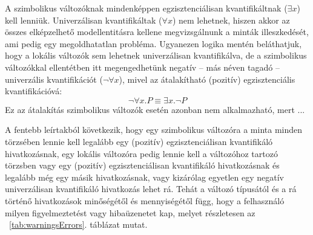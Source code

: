 A szimbolikus változóknak mindenképpen egzisztenciálisan kvantifikáltnak ($\exists x$) kell lenniük. Univerzálisan kvantifikáltak ($\forall x$) nem lehetnek, hiszen akkor az összes elképzelhető modellentitásra kellene megvizsgálnunk a minták illeszkedését, ami pedig egy megoldhatatlan probléma. Ugyanezen logika mentén beláthatjuk, hogy a lokális változók sem lehetnek univerzálisan kvantifikálva, de a szimbolikus változókkal ellentétben itt megengedhetünk negatív -- más néven tagadó -- univerzális kvantifikációt ($\neg\forall x$), mivel az átalakítható (pozitív) egzisztenciális kvantifikációvá: 
\begin{equation}
\neg\forall x. P \equiv \exists x. \neg P \label{eq:negforalltoexists}
\end{equation}
Ez az átalakítás szimbolikus változók esetén azonban nem alkalmazható, mert ...

A fentebb leírtakból következik, hogy egy szimbolikus változóra a minta minden törzsében lennie kell legalább egy (pozitív) egzisztenciálisan kvantifikáló hivatkozásnak, egy lokális változóra pedig lennie kell a változóhoz tartozó törzsben vagy egy (pozitív) egzisztenciálisan kvantifikáló hivatkozásnak és legalább még egy másik hivatkozásnak, vagy kizárólag egyetlen egy negatív univerzálisan kvantifikáló hivatkozás lehet rá.
Tehát a változó típusától és a rá történő hivatkozások minőségétől és mennyiségétől függ, hogy a felhasználó milyen figyelmeztetést vagy hibaüzenetet kap, melyet részletesen az ~\ref{tab:warningsErrors}. táblázat mutat.

